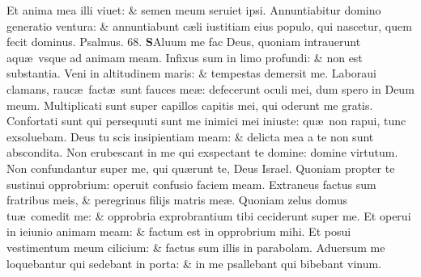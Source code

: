 \documentclass[a5paper,10pt]{book}
\def\ae{æ}
\begin{document}
\begin{multicols*}{2}
\newline \color{red} E\color{black}t anima mea illi viuet: \& semen meum seruiet ipsi.
\newline \color{red} A\color{black}nnuntiabitur domino generatio ventura: \& annuntiabunt c\ae li iustitiam eius populo, qui nascetur, quem fecit dominus. \quad \color{red} Psalmus. 68. \color{black}
\vspace{-1em}
\lettrine[lines=2]{\bfseries \color{red} S}{}Aluum me fac Deus, quoniam intrauerunt aqu\ae \ vsque ad animam meam.
\newline \color{red} I\color{black}nfixus sum in limo profundi: \& non est substantia.
\newline \color{red} V\color{black}eni in altitudinem maris: \& tempestas demersit me.
\newline \color{red} L\color{black}aboraui clamans, rauc\ae \ fact\ae \ sunt fauces me\ae : defecerunt oculi mei, dum spero in Deum meum.
\newline \color{red} M\color{black}ultiplicati sunt super capillos capitis mei, qui oderunt me gratis.
\newline \color{red} C\color{black}onfortati sunt qui persequuti sunt me inimici mei iniuste: qu\ae \ non rapui, tunc exsoluebam.
\newline \color{red} D\color{black}eus tu scis insipientiam meam: \& delicta mea a te non sunt abscondita.
\newline \color{red} N\color{black}on erubescant in me qui exspectant te domine: domine virtutum.
\newline \color{red} N\color{black}on confundantur super me, qui qu\ae runt te, Deus Israel.
\newline \color{red} Q\color{black}uoniam propter te sustinui opprobrium: operuit confusio faciem meam.
\newline \color{red} E\color{black}xtraneus factus sum fratribus meis, \& peregrinus filijs matris me\ae .
\newline \color{red} Q\color{black}uoniam zelus domus tu\ae \ comedit me: \& opprobria exprobrantium tibi ceciderunt super me.
\newline \color{red} E\color{black}t operui in ieiunio animam meam: \& factum est in opprobrium mihi.
\newline \color{red} E\color{black}t posui vestimentum meum cilicium: \& factus sum illis in parabolam.
\newline \color{red} A\color{black}duersum me loquebantur qui sedebant in porta: \& in me psallebant qui bibebant vinum.

\end{multicols*}
\end{document}
